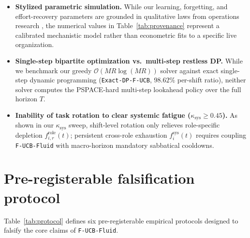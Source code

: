 \documentclass[11pt]{article}
\begin{document}
\begin{itemize}
  \item \textbf{Stylized parametric simulation.} While our learning, forgetting, and effort-recovery parameters are grounded in qualitative laws from operations research \citep{jaber1996learning, hopp2004chaining, meijman1998effort}, the numerical values in Table~\ref{tab:provenance} represent a calibrated mechanistic model rather than econometric fits to a specific live organization.
  \item \textbf{Single-step bipartite optimization vs.\ multi-step restless DP.} While we benchmark our greedy $\mathcal{O}(MR\log(MR))$ solver against exact single-step dynamic programming (\texttt{Exact-DP-F-UCB}, $98.62\%$ per-shift ratio), neither solver computes the PSPACE-hard multi-step lookahead policy over the full horizon $T$.
  \item \textbf{Inability of task rotation to clear systemic fatigue ($\kappa_{\mathrm{sys}} \ge 0.45$).} As shown in our $\kappa_{\mathrm{sys}}$ sweep, shift-level rotation only relieves role-specific depletion $f_{i,r}^{\mathrm{role}}(t)$; persistent cross-role exhaustion $f_i^{\mathrm{sys}}(t)$ requires coupling \texttt{F-UCB-Fluid} with macro-horizon mandatory sabbatical cooldowns.
\end{itemize}

\section{Pre-registerable falsification protocol}\label{sec:protocol}

Table~\ref{tab:protocol} defines six pre-registerable empirical protocols designed to falsify the core claims of \texttt{F-UCB-Fluid}.
\end{document}
